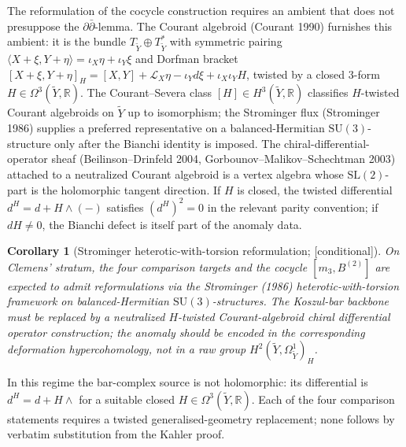 \documentclass[11pt,reqno]{amsart}
\theoremstyle{plain}
\newtheorem{corollary}[theorem]{Corollary}
\theoremstyle{definition}
\theoremstyle{remark}
\providecommand{\ClaimStatusConditional}{\textnormal{[conditional]}}
\newcommand{\Rbb}{\mathbb{R}}
\begin{document}
The reformulation of the cocycle construction requires an ambient that does not presuppose the $\partial\bar\partial$-lemma. The Courant algebroid (Courant 1990) furnishes this ambient: it is the bundle $T_{\tilde Y} \oplus T^*_{\tilde Y}$ with symmetric pairing $\langle X + \xi, Y + \eta \rangle = \iota_X \eta + \iota_Y \xi$ and Dorfman bracket $[X + \xi, Y + \eta]_H = [X, Y] + \mathcal{L}_X \eta - \iota_Y d\xi + \iota_X \iota_Y H$, twisted by a closed $3$-form $H \in \Omega^3(\tilde Y, \Rbb)$. The Courant--Severa class $[H] \in H^3(\tilde Y, \Rbb)$ classifies $H$-twisted Courant algebroids on $\tilde Y$ up to isomorphism; the Strominger flux (Strominger 1986) supplies a preferred representative on a balanced-Hermitian $\mathrm{SU}(3)$-structure only after the Bianchi identity is imposed. The chiral-differential-operator sheaf (Beilinson--Drinfeld 2004, Gorbounov--Malikov--Schechtman 2003) attached to a neutralized Courant algebroid is a vertex algebra whose $\mathrm{SL}(2)$-part is the holomorphic tangent direction. If $H$ is closed, the twisted differential $d^H=d+H\wedge(-)$ satisfies $(d^H)^2=0$ in the relevant parity convention; if $dH\neq0$, the Bianchi defect is itself part of the anomaly data.

\begin{corollary}[Strominger heterotic-with-torsion reformulation; \ClaimStatusConditional]
\label{cor:strominger}
On Clemens' stratum, the four comparison targets and the cocycle $[m_3, B^{(2)}]$ are expected to admit reformulations via the Strominger (1986) heterotic-with-torsion framework on balanced-Hermitian $\mathrm{SU}(3)$-structures. The Koszul-bar backbone must be replaced by a neutralized $H$-twisted Courant-algebroid chiral differential operator construction; the anomaly should be encoded in the corresponding deformation hypercohomology, not in a raw group $H^2(\tilde Y,\Omega^1_{\tilde Y})_H$.
\end{corollary}

In this regime the bar-complex source is not holomorphic: its differential is $d^H = d + H\wedge$ for a suitable closed $H \in \Omega^3(\tilde Y, \Rbb)$. Each of the four comparison statements requires a twisted generalised-geometry replacement; none follows by verbatim substitution from the Kahler proof.
\end{document}
